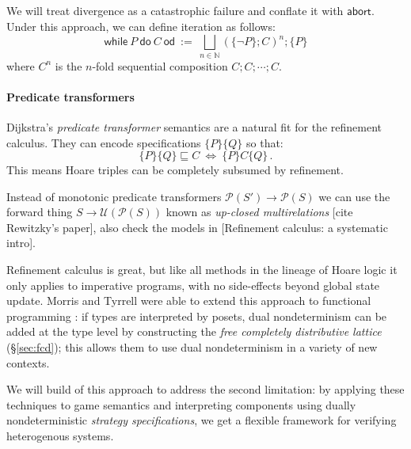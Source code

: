 \documentclass[format=sigplan,authordraft]{acmart}
\newcommand{\kw}[1]{\ensuremath{ \mathsf{#1} }}
\newcommand{\htr}[3]{{ \{{#1}\} {#2} \{{#3}\} }}
\begin{document}
We will treat divergence as a catastrophic failure
and conflate it with \kw{abort}.
Under this approach,
we can define iteration as follows:
\[
  \kw{while} \: P \: \kw{do} \: C \: \kw{od} \: := \:
    \bigsqcup_{n \in \mathbb{N}}
    (\{\neg P\}; C)^n ; \{P\}
\]
where $C^n$ is the $n$-fold sequential composition
$C ; C ; \cdots ; C$.



\paragraph{Predicate transformers} %

Dijkstra's \emph{predicate transformer} semantics
are a natural fit for the refinement calculus.
They can encode specifications $\{P\}\{Q\}$
so that:
\[
    \{P\}\{Q\} \sqsubseteq C \: \Leftrightarrow \: \htr{P}{C}{Q} \,.
\]
This means Hoare triples can be completely subsumed by refinement.

Instead of monotonic predicate transformers
$\mathcal{P}(S') \rightarrow \mathcal{P}(S)$
we can use the forward thing
$S \rightarrow \mathcal{U}(\mathcal{P}(S))$
known as \emph{up-closed multirelations} [cite Rewitzky's paper],
also check the models in [Refinement calculus: a systematic intro].

Refinement calculus is great,
but like all methods in the lineage of Hoare logic
it only applies to imperative programs,
with no side-effects beyond global state update.
Morris and Tyrrell were able to extend this approach
to functional programming
\cite{augtyp,dndf,cspdnd}:
if types are interpreted by posets,
dual nondeterminism can be added at the type level
by constructing the
\emph{free completely distributive lattice} (\S\ref{sec:fcd});
this allows them to use dual nondeterminism
in a variety of new contexts.

We will build of this approach to address the second limitation:
by applying these techniques to game semantics
and interpreting components using
dually nondeterministic \emph{strategy specifications},
we get a flexible framework for verifying
heterogenous systems.


\end{document}
